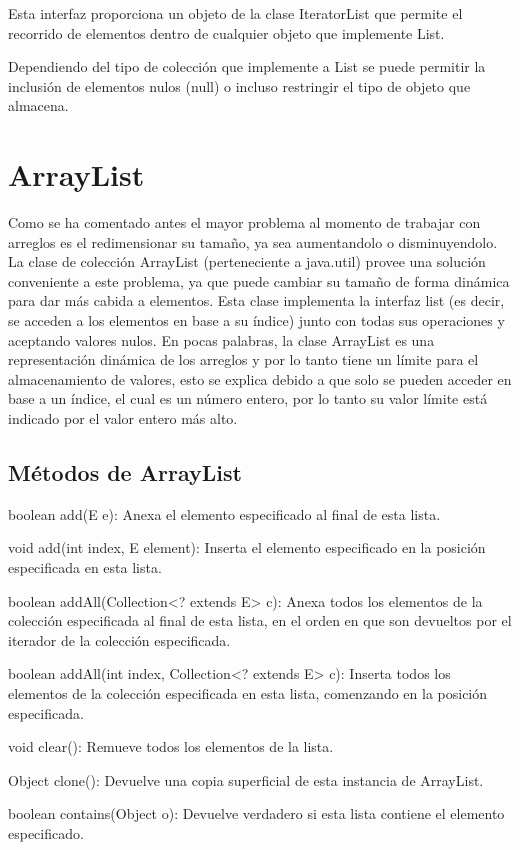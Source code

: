 \documentclass[12pt,a4paper]{report}
\begin{document}
{Esta interfaz proporciona un objeto de la clase IteratorList que permite el recorrido de elementos dentro de cualquier objeto que implemente List.

Dependiendo del tipo de colección que implemente a List se puede permitir la inclusión de elementos nulos (null) o incluso restringir el tipo de objeto que almacena.

\section*{ArrayList}
Como se ha comentado antes el mayor problema al momento de trabajar con arreglos es el redimensionar su tamaño, ya sea aumentandolo o disminuyendolo.  La clase de colección ArrayList (perteneciente a java.util) provee una solución conveniente a este problema, ya que puede cambiar su tamaño de forma dinámica para dar más cabida a elementos. 
Esta clase implementa la interfaz list (es decir, se acceden a los elementos en base a su índice) junto con todas sus operaciones y aceptando valores nulos. En pocas palabras, la clase ArrayList es una representación dinámica de los arreglos  y por lo tanto tiene un límite para el almacenamiento de valores, esto se explica debido a que solo se pueden acceder en base a un índice, el cual es un número entero, por lo tanto su valor límite está indicado por el valor entero más alto.

\subsection*{Métodos de ArrayList }
boolean add(E e): Anexa el elemento especificado al final de esta lista.

void add(int index, E element): Inserta el elemento especificado en la posición especificada en esta lista.

boolean addAll(Collection<? extends E> c): Anexa todos los elementos de la colección especificada al final de esta lista, en el orden en que son devueltos por el iterador de la colección especificada.

boolean addAll(int index, Collection<? extends E> c): Inserta todos los elementos de la colección especificada en esta lista, comenzando en la posición especificada.

void clear(): Remueve todos los elementos de la lista.

Object clone(): Devuelve una copia superficial de esta instancia de ArrayList.

boolean contains(Object o): Devuelve verdadero si esta lista contiene el elemento especificado.

}
\end{document}
